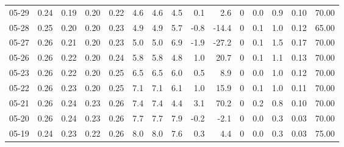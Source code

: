 \begin{threeparttable}
{\begin{tabular}{lrrrrrrrrrrrrrr}
  05-29 &          0.24 &          0.19 &          0.20 &        0.22 &                 4.6 &                4.6 &                 4.5 &        0.1 &          2.6 &              0 &                 0.0 &              0.9 &            0.10 &                  70.00 \\
  05-28 &          0.25 &          0.20 &          0.20 &        0.23 &                 4.9 &                4.9 &                 5.7 &       -0.8 &        -14.4 &              0 &                 0.1 &              1.0 &            0.12 &                  65.00 \\
  05-27 &          0.26 &          0.21 &          0.20 &        0.23 &                 5.0 &                5.0 &                 6.9 &       -1.9 &        -27.2 &              0 &                 0.1 &              1.5 &            0.17 &                  70.00 \\
  05-26 &          0.26 &          0.22 &          0.20 &        0.24 &                 5.8 &                5.8 &                 4.8 &        1.0 &         20.7 &              0 &                 0.1 &              1.1 &            0.13 &                  70.00 \\
  05-23 &          0.26 &          0.22 &          0.20 &        0.25 &                 6.5 &                6.5 &                 6.0 &        0.5 &          8.9 &              0 &                 0.0 &              1.0 &            0.12 &                  70.00 \\
  05-22 &          0.26 &          0.23 &          0.20 &        0.25 &                 7.1 &                7.1 &                 6.1 &        1.0 &         15.9 &              0 &                 0.1 &              1.0 &            0.11 &                  70.00 \\
  05-21 &          0.26 &          0.24 &          0.23 &        0.26 &                 7.4 &                7.4 &                 4.4 &        3.1 &         70.2 &              0 &                 0.2 &              0.8 &            0.10 &                  70.00 \\
  05-20 &          0.26 &          0.24 &          0.23 &        0.26 &                 7.7 &                7.7 &                 7.9 &       -0.2 &         -2.1 &              0 &                 0.0 &              0.3 &            0.03 &                  70.00 \\
  05-19 &          0.24 &          0.23 &          0.22 &        0.26 &                 8.0 &                8.0 &                 7.6 &        0.3 &          4.4 &              0 &                 0.0 &              0.3 &            0.03 &                  75.00 \\

\end{tabular}}
\end{threeparttable}
